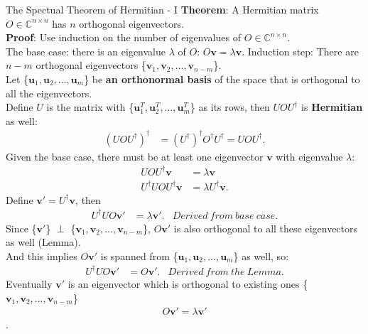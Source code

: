 \documentclass{beamer}
\begin{document}
\begin{frame}{The Spectual Theorem of Hermitian - I\tiny{\cite{thespectraltheoremforhermitianmatrice}}}
  {\tiny
  \textbf{Theorem}: A Hermitian matrix $O \in \mathbb{C}^{n \times n}$  has $n$ orthogonal eigenvectors. \\
  \textbf{Proof}:
  Use induction on the number of eigenvalues of $O \in \mathbb{C}^{n \times n}$. \\
  The base case: there is an eigenvalue $\lambda$ of $O$: $O\mathbf{v} = \lambda \mathbf{v}$.
  Induction step:
  There are $n-m$ orthogonal eigenvectors \{$\mathbf{v}_1, \mathbf{v}_2, \dots, \mathbf{v}_{n-m}$\}. \\
  Let \{$\mathbf{u}_1, \mathbf{u}_2, \dots, \mathbf{u}_m$\} be \textbf{an orthonormal basis} of the space that is orthogonal to all the eigenvectors. \\
  Define $U$ is the matrix with \{$\mathbf{u}_1^T, \mathbf{u}_2^T, \dots, \mathbf{u}_m^T$\} as its rows,
  then $UOU^{\dagger}$ is \textbf{Hermitian} as well:
  \begin{align*}
  (UOU^{\dagger})^{\dagger} &= (U^{\dagger})^{\dagger} O^{\dagger} U^{\dagger} = UOU^{\dagger}.
  \end{align*}
  Given the base case, there must be at least one eigenvector $\mathbf{v}$ with eigenvalue $\lambda$:
  \begin{align*}
    UOU^{\dagger} \mathbf{v} &= \lambda \mathbf{v} \\
    U^{\dagger}UOU^{\dagger} \mathbf{v} &= \lambda U^{\dagger}\mathbf{v}.
  \end{align*}
  Define $\mathbf{v}' = U^{\dagger}\mathbf{v}$, then
  \begin{align*}
    U^{\dagger}U O \mathbf{v}' &= \lambda \mathbf{v}'. & Derived\ from\ base\ case.
  \end{align*}
  Since \{$\mathbf{v}'$\} $\perp$ \{$\mathbf{v}_1, \mathbf{v}_2, \dots, \mathbf{v}_{n-m}$\},
  $O\mathbf{v}'$ is also orthogonal to all these eigenvectors as well (Lemma). \\
  And this implies $O \mathbf{v}'$ is spanned from \{$\mathbf{u}_1, \mathbf{u}_2, \dots, \mathbf{u}_m$\} as well, so:
  \begin{align*}
    U^{\dagger}U O \mathbf{v}' &= O \mathbf{v}'. & Derived\ from\ the\ Lemma.
  \end{align*}
  Eventually $\mathbf{v}'$ is an eigenvector which is orthogonal to existing ones \{$\mathbf{v}_1, \mathbf{v}_2, \dots, \mathbf{v}_{n-m}$\}
  \begin{align*}
    O \mathbf{v}' = \lambda \mathbf{v}'
  \end{align*}.
  }%
\end{frame}
\end{document}
